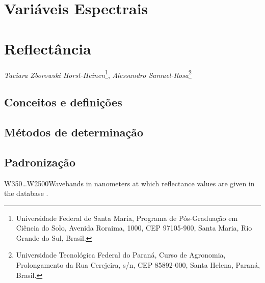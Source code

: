 \documentclass[
]{book}
\begin{document}
\hypertarget{variuxe1veis-espectrais}{%
\chapter*{Variáveis Espectrais}\label{variuxe1veis-espectrais}}

\hypertarget{reflectuxe2ncia}{%
\chapter{Reflectância}\label{reflectuxe2ncia}}

\emph{Taciara Zborowski Horst-Heinen}\footnote{Universidade Federal de Santa Maria, Programa de Pós-Graduação em Ciência do Solo, Avenida Roraima, 1000, CEP 97105-900, Santa Maria, Rio Grande do Sul, Brasil.}, \emph{Alessandro Samuel-Rosa}\footnote{Universidade Tecnológica Federal do Paraná, Curso de Agronomia, Prolongamento da Rua Cerejeira, s/n, CEP 85892-000, Santa Helena, Paraná, Brasil.}

\hypertarget{conceitos-e-definiuxe7uxf5es-2}{%
\section{Conceitos e definições}\label{conceitos-e-definiuxe7uxf5es-2}}

\hypertarget{muxe9todos-de-determinauxe7uxe3o-2}{%
\section{Métodos de determinação}\label{muxe9todos-de-determinauxe7uxe3o-2}}

\citep{ViscarraRosselEtAl2016}

\hypertarget{padronizauxe7uxe3o-2}{%
\section{Padronização}\label{padronizauxe7uxe3o-2}}

W350\ldots W2500Wavebands in nanometers at which reflectance values are given in the database \citep{ICRAFEtAl2010}.
\end{document}
